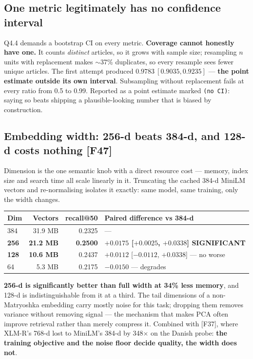 \documentclass[10pt,a4paper]{article}
\newcommand{\F}[1]{\textcolor{blue!55!black}{\footnotesize[#1]}}
\begin{document}
\subsection{One metric legitimately has no confidence interval}\label{sec:ci}

Q4.4 demands a bootstrap CI on every metric. \textbf{Coverage cannot honestly have one.} It counts
\emph{distinct} articles, so it grows with sample size; resampling $n$ units with replacement makes
$\sim$37\% duplicates, so every resample sees fewer unique articles. The first attempt produced
$0.9783\ [0.9035, 0.9235]$ --- \textbf{the point estimate outside its own interval}. Subsampling
without replacement fails at every ratio from 0.5 to 0.99. Reported as a point estimate marked
\texttt{(no CI)}: saying so beats shipping a plausible-looking number that is biased by construction.

\subsection{Embedding width: 256-d beats 384-d, and 128-d costs nothing \F{F47}}

Dimension is the one semantic knob with a direct resource cost --- memory, index size and search
time all scale linearly in it. Truncating the cached 384-d MiniLM vectors and re-normalising
isolates it exactly: same model, same training, only the width changes.

\begin{center}\footnotesize
\begin{tabular}{@{}lrrl@{}}
\toprule
Dim & Vectors & recall@50 & Paired difference vs 384-d \\
\midrule
384 & 31.9 MB & 0.2325 & --- \\
\textbf{256} & \textbf{21.2 MB} & \textbf{0.2500} & \textbf{$+0.0175$ [$+0.0025$, $+0.0338$] SIGNIFICANT} \\
\textbf{128} & \textbf{10.6 MB} & 0.2437 & $+0.0112$ [$-0.0112$, $+0.0338$] --- no worse \\
64 & 5.3 MB & 0.2175 & $-0.0150$ --- degrades \\
\bottomrule
\end{tabular}
\end{center}

\textbf{256-d is significantly better than full width at 34\% less memory}, and 128-d is
indistinguishable from it at a third. The tail dimensions of a non-Matryoshka embedding carry mostly
noise for this task; dropping them removes variance without removing signal --- the mechanism that
makes PCA often improve retrieval rather than merely compress it. Combined with \F{F37}, where
XLM-R's 768-d lost to MiniLM's 384-d by 348$\times$ on the Danish probe: \textbf{the training
objective and the noise floor decide quality, the width does not}.
\end{document}
